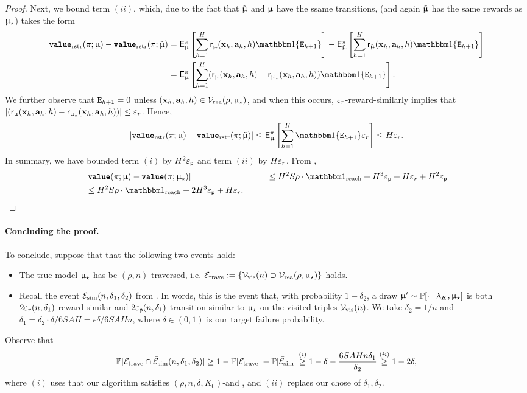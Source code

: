 \begin{proof}
Next, we bound term $(ii)$, which, due to the fact that $\tilde{\upmu}$ and $\upmu$ have the ssame transitions, (and again $\tilde{\upmu}$ has the same rewards as $\upmu_{\star}$) takes the form
\begin{align*}
\valuefrest{\pi}{\model} - \valuefrest{\pi}{\modtil} &= \sfE^{\pi}_{\model}\left[\sum_{h=1}^H \sfr_{\model}(\bmx_h,\bma_h,h) \ind\{\scrE_{h+1}\}\right] - \sfE^{\pi}_{\modtil}\left[\sum_{h=1}^H \sfr_{\modtil}(\bmx_h,\bma_h,h) \ind\{\scrE_{h+1}\}\right]\\
 &=\sfE^{\pi}_{\model}\left[\sum_{h=1}^H (\sfr_{\model}(\bmx_h,\bma_h,h) - \sfr_{\modst}(\bmx_h,\bma_h,h))\ind\{\scrE_{h+1}\}\right].
\end{align*}
We further observe that $\texttt{E}_{h+1} = 0$ unless $(\mathbf{x}_h,\mathbf{a}_h,h) \in \mathcal{V}_{\mathrm{rea}}(\rho,\upmu_{\star})$, and when this occurs, $\varepsilon_{r}$-reward-similarly implies that $|(\mathsf{r}_{\upmu}(\mathbf{x}_h,\mathbf{a}_h,h) - \mathsf{r}_{\upmu_{\star}}(\mathbf{x}_h,\mathbf{a}_h,h))| \le \varepsilon_{r}$. Hence,
\begin{align*}
|\valuefrest{\pi}{\model} - \valuefrest{\pi}{\modtil}| \le  \sfE^{\pi}_{\model}\left[\sum_{h=1}^H \ind\{\scrE_{h+1}\}\epsr\right] \le H\epsr.
\end{align*}
In summary, we have bounded term $(i)$ by $H^2 \varepsilon_{\mathsf{p}}$ and term $(ii)$ by $H\varepsilon_{r}$. From ,
\begin{align*}
 &|\valuef{\pi}{\model}  - \valuef{\pi}{\modst}| &\le  H^2 S \rho \cdot \indreach+ H^3 \epsp + H \epsr + H^2 \epsp \\
 &\le H^2 S \rho \cdot \indreach + 2 H^3 \epsp + H\epsr. \qquad\qedhere
\end{align*}
\end{proof}

\paragraph{Concluding the proof. }
\newcommand{\Etrav}{\mathcal{E}_{\mathrm{trave}}}
To conclude, suppose that that the following two events hold:
\begin{itemize}
\item The true model $\upmu_{\star}$ has be $(\rho,n)$-traversed, i.e. $\Etrav := \{\Vvis(n) \supset \Vreach(\rho,\modst)\}$ holds.
\item Recall the event $\bar{\mathcal{E}}_{\mathrm{sim}}(n,\delta_1,\delta_2)$ from . In words, this is the event that, with probability $1 - \delta_2$, a draw $\upmu' \sim \operatorname{\mathbb{P}}[\cdot \mid \uplambda_K,\upmu_{\star}]$ is both $2\varepsilon_{r}(n,\delta_1)$-reward-similar and $2\varepsilon_{\mathsf{p}}(n,\delta_1)$-transition-similar to $\upmu_{\star}$ on the visited triples $\mathcal{V}_{\mathrm{vis}}(n)$. We take $\delta_2 = 1/n$ and $\delta_1 = \delta_2\cdot \delta/6SAH = \epsilon \delta/6SAH n$, where $\delta \in (0,1)$ is our target failure probability.
\end{itemize}
Observe that
\begin{align}
\Pr[\Etrav \cap \Ebarsim(n,\delta_1,\delta_2)] \ge  1 - \Pr[\Etrav] - \Pr[\Ebarsim] \overset{(i)}{\ge} 1 - \delta - \frac{6SAHn \delta_1}{\delta_2} \overset{(ii)}{\ge} 1 - 2\delta,
\end{align}
where $(i)$ uses that our algorithm satisfies $(\rho,n,\delta,K_0)$-\traversal and , and $(ii)$ replaes our chose of $\delta_1,\delta_2$.


